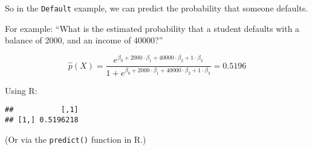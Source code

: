 \documentclass[10pt,ignorenonframetext,]{beamer}
\newenvironment{Shaded}{\begin{snugshade}}{\end{snugshade}}
\newcommand{\DecValTok}[1]{\textcolor[rgb]{0.00,0.00,0.81}{#1}}
\newcommand{\KeywordTok}[1]{\textcolor[rgb]{0.13,0.29,0.53}{\textbf{#1}}}
\newcommand{\NormalTok}[1]{#1}
\newcommand{\OperatorTok}[1]{\textcolor[rgb]{0.81,0.36,0.00}{\textbf{#1}}}
\newcommand{\StringTok}[1]{\textcolor[rgb]{0.31,0.60,0.02}{#1}}
\begin{document}
\begin{frame}[fragile]

So in the \texttt{Default} example, we can predict the probability that
someone defaults.

For example: ``What is the estimated probability that a student defaults
with a balance of 2000, and an income of 40000?''

\[\hat{p}(X) = \frac{e^{\beta_0 + 2000 \cdot \beta_1 + 40000 \cdot \beta_2 + 1 \cdot \beta_3}}{ 1+  e^{\beta_0 + 2000 \cdot \beta_1 + 40000 \cdot \beta_2 + 1 \cdot \beta_3}} = 0.5196\]
\vspace{6mm}

Using R: \scriptsize

\begin{Shaded}
\end{Shaded}

\begin{verbatim}
##           [,1]
## [1,] 0.5196218
\end{verbatim}

\normalsize

(Or via the \texttt{predict()} function in R.)

\end{frame}
\end{document}
